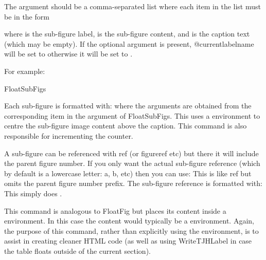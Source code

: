 \documentclass[toc=listof]{scrreport}
\begin{document}
The  argument should be a comma-separated list
where each item in the list must be in the form
\begin{compactcodebox}
\end{compactcodebox}
where  is the sub-figure label, 
 is the sub-figure content, and
 is the caption text (which may be empty).
If the  optional argument is present, 
\gls{@currentlabelname} will be set to 
otherwise it will be set to .

For example:
\begin{codebox}
\gls{FloatSubFigs}
\end{codebox}

Each sub-figure is formatted with:
where the arguments are obtained from the corresponding item in the
 argument of \gls{FloatSubFigs}.
This uses a  environment to centre the sub-figure image content
above the caption. This command is also responsible for incrementing
the  counter.

A sub-figure can be referenced with \gls{ref} (or \gls{figureref}
etc) but there it will include the parent figure number. If you only
want the actual sub-figure reference (which by default is a
lowercase letter: a, b, etc) then you can use:
This is like \gls{ref} but omits the parent figure number prefix.
The sub-figure reference is formatted with:
This simply does .

This command is analogous to \gls{FloatFig} but places its content
inside a  environment. In this case the content would
typically be a  environment. Again, the purpose of this
command, rather than explicitly using the  environment,
is to assist  in creating cleaner HTML code
(as well as using \gls{WriteTJHLabel} in case the table floats
outside of the current section).
\end{document}
